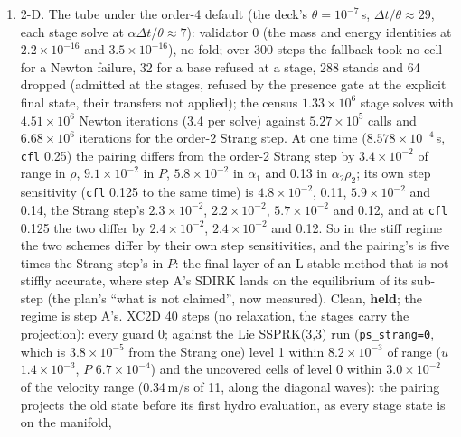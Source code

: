 \documentclass[11pt,a4paper]{article}
\newcommand{\code}[1]{\texttt{\small #1}}
\newcommand{\Dt}{\Delta t}
\begin{document}
\begin{enumerate}[nosep]
      the fallback reaches and stands again (the same state), and the
      counts say where the gate is asked, not where the pairing fails.
      The B12 mirror under the pairing reads $2.9\times10^{-7}$\,Pa
      (step A $8.1\times10^{-6}$, order 1 $9.3\times10^{-3}$).
\item 2-D.  The tube under the order-4 default (the deck's
      $\theta = 10^{-7}$\,s, $\Dt/\theta \approx 29$, each stage solve
      at $\alpha\Dt/\theta \approx 7$): validator 0 (the mass and energy
      identities at $2.2\times10^{-16}$ and $3.5\times10^{-16}$), no
      fold; over 300 steps the fallback took no cell for a Newton
      failure, 32 for a base refused at a stage, 288 stands and 64
      dropped (admitted at the stages, refused by the presence gate at
      the explicit final state, their transfers not applied); the
      census $1.33\times10^{6}$ stage solves with $4.51\times10^{6}$
      Newton iterations (3.4 per solve) against $5.27\times10^{5}$
      calls and $6.68\times10^{6}$ iterations for the order-2 Strang
      step.  At one time ($8.578\times10^{-4}$\,s, \code{cfl} 0.25) the
      pairing differs from the order-2 Strang step by $3.4\times10^{-2}$
      of range in $\rho$, $9.1\times10^{-2}$ in $P$, $5.8\times10^{-2}$
      in $\alpha_1$ and 0.13 in $\alpha_2\rho_2$; its own step
      sensitivity (\code{cfl} 0.125 to the same time) is
      $4.8\times10^{-2}$, 0.11, $5.9\times10^{-2}$ and 0.14, the Strang
      step's $2.3\times10^{-2}$, $2.2\times10^{-2}$, $5.7\times10^{-2}$
      and 0.12, and at \code{cfl} 0.125 the two differ by
      $2.4\times10^{-2}$, $2.4\times10^{-2}$ and 0.12.  So in the stiff
      regime the two schemes differ by their own step sensitivities,
      and the pairing's is five times the Strang step's in $P$: the
      final layer of an L-stable method that is not stiffly accurate,
      where step A's SDIRK lands on the equilibrium of its sub-step
      (the plan's ``what is not claimed'', now measured).  Clean,
      \textbf{held}; the regime is step A's.  XC2D 40 steps (no
      relaxation, the stages carry the projection): every guard 0;
      against the Lie SSPRK(3,3) run (\code{ps\_strang=0}, which is
      $3.8\times10^{-5}$ from the Strang one) level 1 within
      $8.2\times10^{-3}$ of range ($u$ $1.4\times10^{-3}$, $P$
      $6.7\times10^{-4}$) and the uncovered cells of level 0 within
      $3.0\times10^{-2}$ of the velocity range (0.34\,m/s of 11, along
      the diagonal waves): the pairing projects the old state before its
      first hydro evaluation, as every stage state is on the manifold,

\end{enumerate}
\end{document}
